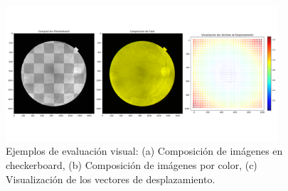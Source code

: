 \begin{figure}[tbp]
    \centering
    \includegraphics[width=0.9\textwidth]{imaxes/visex.png}
    \caption{Ejemplos de evaluación visual: (a) Composición de imágenes en checkerboard, (b) Composición de imágenes por color, (c) Visualización de los vectores de desplazamiento.}
    \label{fig:visex}
\end{figure}